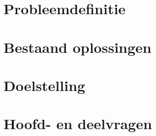 
\section{Probleemdefinitie}

\section{Bestaand oplossingen}

\section{Doelstelling}

\section{Hoofd- en deelvragen}